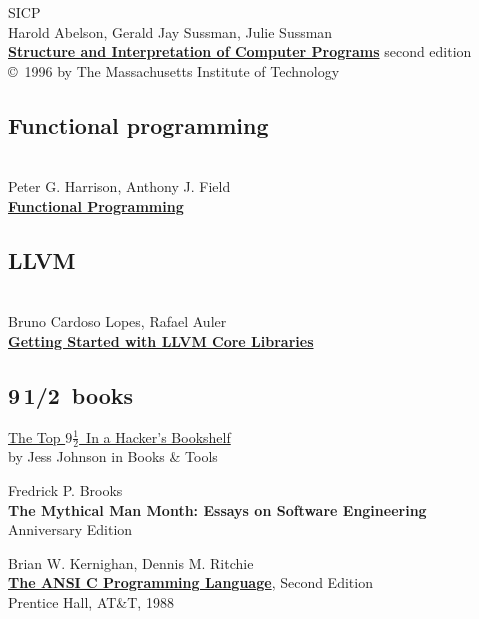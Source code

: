 \begin{thebibliography}{9}
 SICP
\\
Harold Abelson, Gerald Jay Sussman, Julie Sussman\\
\textbf{\href{https://mitpress.mit.edu/sicp/full-text/book/book.html}{Structure
and Interpretation of Computer Programs}} second edition\\
\copyright\ 1996 by The Massachusetts Institute of Technology

\subsection*{Functional programming}

\\
Peter G. Harrison, Anthony J. Field\\
\textbf{\href{http://www.amazon.com/Functional-Programming-International-Computer-Science/dp/0201192497}{Functional Programming}}

\subsection*{LLVM}

\\
Bruno Cardoso Lopes, Rafael Auler\\
\textbf{\href{http://www.amazon.com/Getting-Started-LLVM-Core-Libraries/dp/1782166920}{Getting Started with LLVM Core Libraries}}

\subsection*{9\,1/2\ books}

\href{http://grokcode.com/11/the-top-9-in-a-hackers-bookshelf/}{The Top
$9\frac{1}{2}$\ In a Hacker’s Bookshelf}\\
by Jess Johnson	in Books \& Tools

 Fredrick P. Brooks\\
\textbf{The Mythical Man Month: Essays on Software Engineering}\\
Anniversary Edition

 Brian W. Kernighan, Dennis M. Ritchie\\
\textbf{\href{https://hassanolity.files.wordpress.com/2013/11/the_c_programming_language_2.pdf}{The ANSI C Programming Language}}, Second Edition\\
Prentice Hall, AT\&T, 1988 

\end{thebibliography}